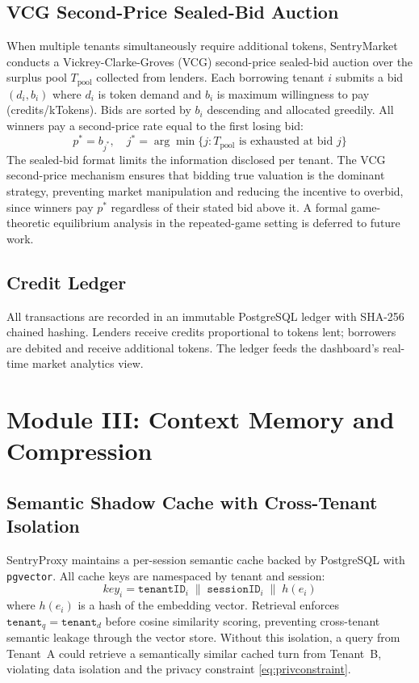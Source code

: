 \documentclass[conference]{IEEEtran}
\begin{document}
\subsection{VCG Second-Price Sealed-Bid Auction}
When multiple tenants simultaneously require additional tokens, SentryMarket conducts a Vickrey-Clarke-Groves (VCG) second-price sealed-bid auction over the surplus pool $T_{\text{pool}}$ collected from lenders. Each borrowing tenant $i$ submits a bid $(d_i, b_i)$ where $d_i$ is token demand and $b_i$ is maximum willingness to pay (credits/kTokens). Bids are sorted by $b_i$ descending and allocated greedily. All winners pay a second-price rate equal to the first losing bid:
\begin{equation}
p^* = b_{j^*}, \quad j^* = \arg\min\{j : T_{\text{pool}} \text{ is exhausted at bid } j\}
\label{eq:auction}
\end{equation}
The sealed-bid format limits the information disclosed per tenant. The VCG second-price mechanism ensures that bidding true valuation is the dominant strategy, preventing market manipulation and reducing the incentive to overbid, since winners pay $p^*$ regardless of their stated bid above it. A formal game-theoretic equilibrium analysis in the repeated-game setting is deferred to future work.

\subsection{Credit Ledger}
All transactions are recorded in an immutable PostgreSQL ledger with SHA-256 chained hashing. Lenders receive credits proportional to tokens lent; borrowers are debited and receive additional tokens. The ledger feeds the dashboard's real-time market analytics view.

\section{Module III: Context Memory and Compression}
\label{sec:cache}

\subsection{Semantic Shadow Cache with Cross-Tenant Isolation}
SentryProxy maintains a per-session semantic cache backed by PostgreSQL with \texttt{pgvector}. All cache keys are namespaced by tenant and session:
\begin{equation}
\textit{key}_i = \texttt{tenantID}_i \;\|\; \texttt{sessionID}_i \;\|\; h(e_i)
\label{eq:cachekey}
\end{equation}
where $h(e_i)$ is a hash of the embedding vector. Retrieval enforces $\texttt{tenant}_{q} = \texttt{tenant}_{d}$ before cosine similarity scoring, preventing cross-tenant semantic leakage through the vector store. Without this isolation, a query from Tenant~A could retrieve a semantically similar cached turn from Tenant~B, violating data isolation and the privacy constraint \eqref{eq:privconstraint}.
\end{document}
